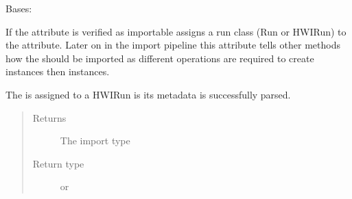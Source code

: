 \documentclass[letterpaper,10pt,english]{sphinxmanual}
\begin{document}
\begin{fulllineitems}
\label{\detokenize{polo.windows:polo.windows.run_importer.ImportCandidate}}
Bases: 

\begin{fulllineitems}
\label{\detokenize{polo.windows:polo.windows.run_importer.ImportCandidate.assign_run_type}}
If the {\hyperref[\detokenize{polo.windows:polo.windows.run_importer.ImportCandidate.path}]{}} attribute is verified as importable assigns a run class
(Run or HWIRun) to the  attribute. Later on in the import
pipeline this attribute tells other methods how the {\hyperref[\detokenize{polo.windows:polo.windows.run_importer.ImportCandidate}]{}}
should be imported as different operations are required to create 
instances then  instances.

The {\hyperref[\detokenize{polo.windows:polo.windows.run_importer.ImportCandidate}]{}} is assigned to a HWIRun is its metadata is
successfully parsed.
\begin{quote}\begin{description}
\item[{Returns}] \leavevmode
The import type

\item[{Return type}] \leavevmode
{\hyperref[\detokenize{polo.crystallography:polo.crystallography.run.Run}]{}} or {\hyperref[\detokenize{polo.crystallography:polo.crystallography.run.HWIRun}]{}}

\end{description}\end{quote}

\end{fulllineitems}



\end{fulllineitems}
\end{document}
